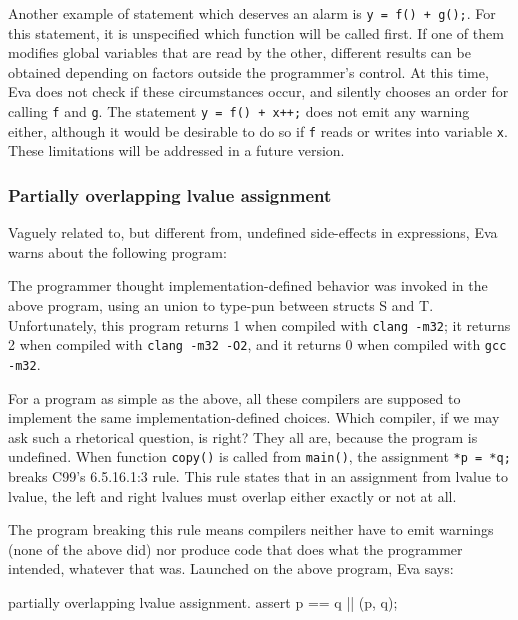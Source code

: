 \documentclass[web]{frama-c-book}
\newcommand{\isoc}{\textsf{C99}}
\newcommand{\Eva}{\textsf{Eva}}
\begin{document}
Another example of statement which deserves an alarm
is \lstinline|y = f() + g();|. For this statement, it is
unspecified which function will be called first.  If one of them
modifies global variables that are read by the other, different
results can be obtained depending on factors outside the programmer's
control. At this time, \Eva{} does not check if these
circumstances occur, and silently chooses an order for calling
\lstinline|f| and \lstinline|g|. The statement 
\lstinline|y = f() + x++;| 
does not emit any warning either, although it would be desirable
to do so if \lstinline|f| reads or writes into variable \lstinline|x|.
These limitations will be addressed in a future version.

\subsubsection{Partially overlapping lvalue assignment}

Vaguely related to, but different from, undefined side-effects in expressions,
\Eva{} warns about the following program:


The programmer thought implementation-defined behavior was invoked
in the above program, using an union to type-pun between structs S and T.
Unfortunately, this program returns 1 when compiled
with \lstinline|clang -m32|; it returns 2 when compiled 
with \lstinline|clang -m32 -O2|,
and it returns 0 when compiled with \lstinline|gcc -m32|.

For a
program as simple as the above, all these compilers are
supposed to implement the same implementation-defined choices. Which
compiler, if we may ask such a rhetorical
question, is right? They all are, because the program is undefined.
When function \lstinline|copy()| is called from \lstinline|main()|,
the assignment \lstinline|*p = *q;| breaks
\isoc{}'s 6.5.16.1:3 rule. This rule states that 
in an assignment from lvalue to lvalue,
the left and right lvalues must overlap either exactly or not at all.

The program breaking this rule means compilers neither have to emit
warnings (none of the above did) nor produce code that does what the
programmer intended, whatever that was. 
Launched on the above program, \Eva{} says:
\begin{logs}
partially overlapping lvalue assignment. assert p == q || \separated(p, q);
\end{logs}
\end{document}
